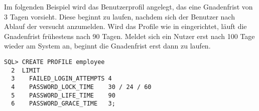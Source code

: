 
        Im folgenden Beispiel wird das Benutzerprofil  angelegt, das eine Gnadenfrist von 3 Tagen vorsieht. Diese beginnt zu laufen, nachdem sich der Benutzer nach Ablauf der  versucht anzumelden. Wird das Profile wie in  eingerichtet, l\"auft die Gnadenfrist fr\"uhestens nach 90 Tagen. Meldet sich ein Nutzer erst nach 100 Tage wieder am System an, beginnt die Gnadenfrist erst dann zu laufen.
        \begin{lstlisting}[caption={Passwortlebensdauer und
        Gnadenfrist},label=admin220,language=oracle_sql]
SQL> CREATE PROFILE employee
  2  LIMIT
  3    FAILED_LOGIN_ATTEMPTS 4
  4    PASSWORD_LOCK_TIME    30 / 24 / 60
  5    PASSWORD_LIFE_TIME    90
  6    PASSWORD_GRACE_TIME   3;
        \end{lstlisting}
